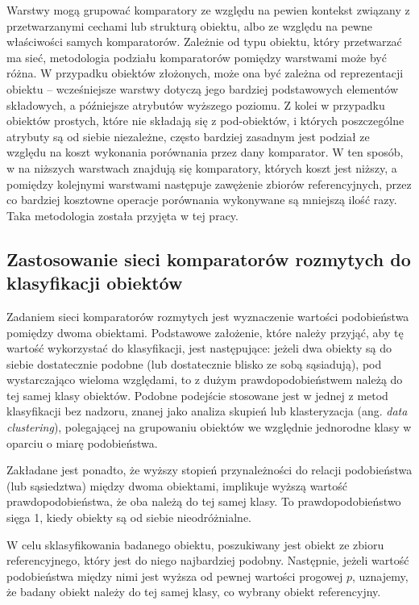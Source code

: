 \documentclass{pracalicmgr}
\begin{document}
    Warstwy mogą grupować komparatory ze względu na pewien kontekst związany z przetwarzanymi cechami lub strukturą obiektu, albo ze względu na pewne właściwości samych komparatorów. Zależnie od typu obiektu, który przetwarzać ma sieć, metodologia podziału komparatorów pomiędzy warstwami może być różna. W przypadku obiektów złożonych, może ona być zależna od reprezentacji obiektu -- wcześniejsze warstwy dotyczą jego bardziej podstawowych elementów składowych, a późniejsze atrybutów wyższego poziomu. Z kolei w przypadku obiektów prostych, które nie składają się z pod-obiektów, i których poszczególne atrybuty są od siebie niezależne, często bardziej zasadnym jest podział ze względu na koszt wykonania porównania przez dany komparator. W ten sposób, w na niższych warstwach znajdują się komparatory, których koszt jest niższy, a pomiędzy kolejnymi warstwami następuje zawężenie zbiorów referencyjnych, przez co bardziej kosztowne operacje porównania wykonywane są mniejszą ilość razy. Taka metodologia została przyjęta w tej pracy.
    \subsection[Klasyfikacja obiektów]{Zastosowanie sieci komparatorów rozmytych do klasyfikacji obiektów}
    Zadaniem sieci komparatorów rozmytych jest wyznaczenie wartości podobieństwa pomiędzy dwoma obiektami. Podstawowe założenie, które należy przyjąć, aby tę wartość wykorzystać do klasyfikacji, jest następujące: jeżeli dwa obiekty są do siebie dostatecznie podobne (lub dostatecznie blisko ze sobą sąsiadują), pod wystarczająco wieloma względami, to z dużym prawdopodobieństwem należą do tej samej klasy obiektów. Podobne podejście stosowane jest w jednej z metod klasyfikacji bez nadzoru, znanej jako analiza skupień lub klasteryzacja (ang. \textit{data clustering}), polegającej na grupowaniu obiektów we względnie jednorodne klasy w oparciu o miarę podobieństwa.
    
    Zakładane jest ponadto, że wyższy stopień przynależności do relacji podobieństwa (lub sąsiedztwa) między dwoma obiektami, implikuje wyższą wartość prawdopodobieństwa, że oba należą do tej samej klasy. To prawdopodobieństwo sięga 1,  kiedy obiekty są od siebie nieodróżnialne.
    
    W celu sklasyfikowania badanego obiektu, poszukiwany jest obiekt ze zbioru referencyjnego, który jest do niego najbardziej podobny. Następnie, jeżeli wartość podobieństwa między nimi jest wyższa od pewnej wartości progowej $p$, uznajemy, że badany obiekt należy do tej samej klasy, co wybrany obiekt referencyjny.
\end{document}
